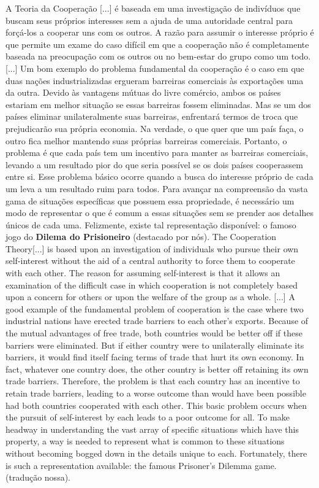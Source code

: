 \citacao
	{%
		A Teoria da Cooperação [...] é baseada em uma investigação de indivíduos que buscam seus próprios interesses sem a ajuda de uma autoridade central para forçá-los a cooperar uns com os outros. A razão para assumir o interesse próprio é que permite um exame do caso difícil em que a cooperação não é completamente baseada na preocupação com os outros ou no bem-estar do grupo como um todo. [...] Um bom exemplo do problema fundamental da cooperação é o caso em que duas nações industrializadas ergueram barreiras comerciais às exportações uma da outra. Devido às vantagens mútuas do livre comércio, ambos os países estariam em melhor situação se essas barreiras fossem eliminadas. Mas se um dos países eliminar unilateralmente suas barreiras, enfrentará termos de troca que prejudicarão sua própria economia. Na verdade, o que quer que um país faça, o outro fica melhor mantendo suas próprias barreiras comerciais. Portanto, o problema é que cada país tem um incentivo para manter as barreiras comerciais, levando a um resultado pior do que seria possível se os dois países cooperassem entre si. Esse problema básico ocorre quando a busca do interesse próprio de cada um leva a um resultado ruim para todos. Para avançar na compreensão da vasta gama de situações específicas que possuem essa propriedade, é necessário um modo de representar o que é comum a essas situações sem se prender aos detalhes únicos de cada uma. Felizmente, existe tal representação disponível: o famoso jogo do \textbf{Dilema do Prisioneiro} (destacado por nós).
	}{%
		The Cooperation Theory[...] is based upon an investigation of individuals who pursue their own self-interest without the aid of a central authority to force them to cooperate with each other. The reason for assuming self-interest is that it allows an examination of the difficult case in which cooperation is not completely based upon a concern for others or upon the welfare of the group as a whole. [...] A good example of the fundamental problem of cooperation is the case where two industrial nations have erected trade barriers to each other's exports. Because of the mutual advantages of free trade, both countries would be better off if these barriers were eliminated. But if either country were to unilaterally eliminate its barriers, it would find itself facing terms of trade that hurt its own economy. In fact, whatever one country does, the other country is better off retaining its own trade barriers. Therefore, the problem is that each country has an incentive to retain trade barriers, leading to a worse outcome than would have been possible had both countries cooperated with each other. This basic problem occurs when the pursuit of self-interest by each leads to a poor outcome for all. To make headway in understanding the vast array of specific situations which have this property, a way is needed to represent what is common to these situations without becoming bogged down in the details unique to each. Fortunately, there is such a representation available: the famous Prisoner's Dilemma game.
	}
	{}
	{(tradução nossa).}

